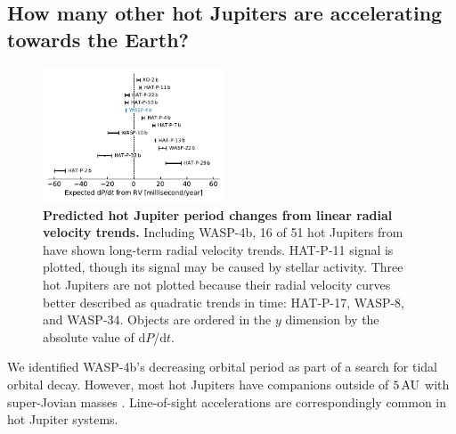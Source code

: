 \documentclass[12pt,twocolumn,tighten]{aastex62}
\begin{document}

\subsection{How many other hot Jupiters are accelerating towards the
Earth?}

\begin{figure}[t]
	\begin{center}
		\leavevmode
		\includegraphics[width=0.48\textwidth]{f5.pdf}
	\end{center}
	\vspace{-0.7cm}
	\caption{
  {\bf Predicted hot Jupiter period changes from linear radial
  velocity trends.} Including WASP-4b, 16 of 51 hot Jupiters from
  \citet{knutson_friends_2014} have shown long-term radial velocity
  trends.  HAT-P-11 signal is plotted, though its signal may be caused
  by stellar activity.  Three hot Jupiters are not plotted because
  their radial velocity curves better described as quadratic trends in
  time: HAT-P-17, WASP-8, and WASP-34.  Objects are ordered in the $y$
  dimension by the absolute value of d$P$/d$t$.
	\label{fig:pdot_pop}
  \vspace{-0.3cm}
	}
\end{figure}

We identified WASP-4b's decreasing orbital period as part of a search
for tidal orbital decay.  However, most hot Jupiters have companions
outside of $5\,{\rm AU}$ with super-Jovian masses
\citep{knutson_friends_2014,bryan_statistics_2016}.  Line-of-sight
accelerations are correspondingly common in hot Jupiter systems. 
\end{document}
